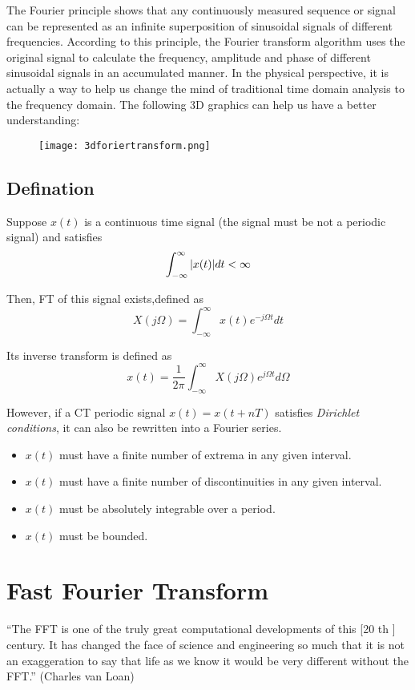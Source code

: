 \documentclass[12pt,a4paper]{article}
\begin{document}
The Fourier principle shows that any continuously measured sequence or signal can be represented as an infinite superposition of sinusoidal signals of different frequencies. According to this principle, the Fourier transform algorithm  uses the original signal to calculate the frequency, amplitude and phase of different sinusoidal signals in an accumulated manner. 
In the physical perspective, it is actually a way to help us change the mind of traditional time domain analysis to the frequency domain. The following 3D graphics can help us have a better understanding:

\begin{figure}[htbp]
\begin{center}
\texttt{[image: 3dforiertransform.png]} 
\end{center}
\end{figure}

\subsection{Defination}
Suppose $x(t)$ is a continuous time signal (the signal must be not a periodic signal) and satisfies
$$ \int_{-\infty}^{\infty} \abs{x(t)}dt < \infty $$

Then, FT of this signal exists,defined as
$$X(j\Omega)=\int_{-\infty}^{\infty} x(t)e^{-j\Omega t} dt$$

Its inverse transform is defined as
$$x(t)=\dfrac{1}{2 \pi} \int_{-\infty}^{\infty} X(j\Omega) e^{j\Omega t} d\Omega$$

However, if a CT periodic signal $x(t)=x(t+nT)$ satisfies \textit{Dirichlet conditions}, it can also be rewritten into a Fourier series. 
\begin{itemize}
\item $x(t)$ must have a finite number of extrema in any given interval.
\item $x(t)$ must have a finite number of discontinuities in any given interval.
\item $x(t)$ must be absolutely integrable over a period.
\item $x(t)$ must be bounded.
\end{itemize}

\section{Fast Fourier Transform}
“The FFT is one of the truly great computational
developments of this [20 th ] century. It has changed
the face of science and engineering so much that it
is not an exaggeration to say that life as we know it
would be very different without the FFT.” (Charles van Loan)
\end{document}
